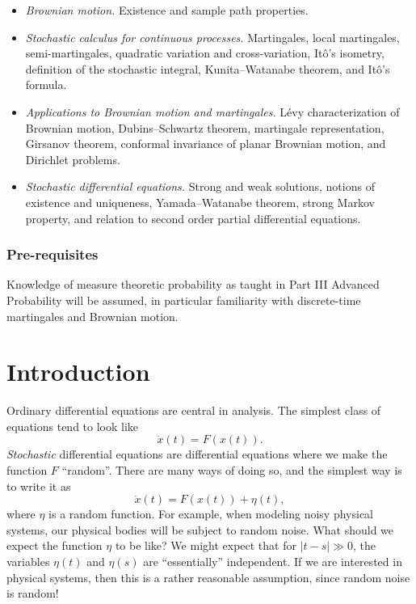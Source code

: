 \documentclass[a4paper]{article}
\begin{document}
\maketitle
{\small
\setlength{\parindent}{0em}
\setlength{\parskip}{1em}
\begin{itemize}
  \item \textit{Brownian motion.} Existence and sample path properties.
  \item \textit{Stochastic calculus for continuous processes.} Martingales, local martingales, semi-martingales, quadratic variation and cross-variation, It\^o's isometry, definition of the stochastic integral, Kunita--Watanabe theorem, and It\^o's formula.
  \item \textit{Applications to Brownian motion and martingales.} L\'evy characterization of Brownian motion, Dubins--Schwartz theorem, martingale representation, Girsanov theorem, conformal invariance of planar Brownian motion, and Dirichlet problems.
  \item \textit{Stochastic differential equations.} Strong and weak solutions, notions of existence and uniqueness, Yamada--Watanabe theorem, strong Markov property, and relation to second order partial differential equations.
\end{itemize}
\subsubsection*{Pre-requisites}
Knowledge of measure theoretic probability as taught in Part III Advanced Probability will be assumed, in particular familiarity with discrete-time martingales and Brownian motion.
}
\tableofcontents

\setcounter{section}{-1}
\section{Introduction}
Ordinary differential equations are central in analysis. The simplest class of equations tend to look like
\[
  \dot{x}(t) = F(x(t)).
\]
\emph{Stochastic} differential equations are differential equations where we make the function $F$ ``random''. There are many ways of doing so, and the simplest way is to write it as
\[
  \dot{x}(t) = F(x(t)) + \eta(t),
\]
where $\eta$ is a random function. For example, when modeling noisy physical systems, our physical bodies will be subject to random noise. What should we expect the function $\eta$ to be like? We might expect that for $|t - s| \gg 0$, the variables $\eta(t)$ and $\eta(s)$ are ``essentially'' independent. If we are interested in physical systems, then this is a rather reasonable assumption, since random noise is random!
\end{document}
